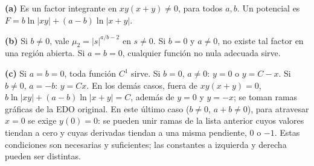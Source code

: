 \noindent\textbf{(a)} Es un factor integrante en $xy(x+y)\ne0$, para todos $a,b$. Un potencial es $F=b\ln|xy|+(a-b)\ln|x+y|$.

\noindent\textbf{(b)} Si $b\ne0$, vale $\mu_2=|s|^{a/b-2}$ en $s\ne0$. Si $b=0$ y $a\ne0$, no existe tal factor en una región abierta. Si $a=b=0$, cualquier función no nula adecuada sirve.

\noindent\textbf{(c)} Si $a=b=0$, toda función $C^1$ sirve. Si $b=0$, $a\ne0$: $y=0$ o $y=C-x$. Si $b\ne0$, $a=-b$: $y=Cx$. En los demás casos, fuera de $xy(x+y)=0$, $b\ln|xy|+(a-b)\ln|x+y|=C$, además de $y=0$ y $y=-x$; se toman ramas gráficas de la EDO original. En este último caso ($b\ne0$, $a+b\ne0$), para atravesar $x=0$ se exige $y(0)=0$: se pueden unir ramas de la lista anterior cuyos valores tiendan a cero y cuyas derivadas tiendan a una misma pendiente, $0$ o $-1$. Estas condiciones son necesarias y suficientes; las constantes a izquierda y derecha pueden ser distintas.
